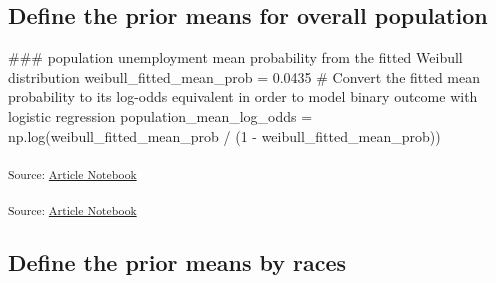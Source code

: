 \documentclass[
]{agujournal2019}
\newenvironment{Shaded}{\begin{snugshade}}{\end{snugshade}}
\newcommand{\CommentTok}[1]{\textcolor[rgb]{0.37,0.37,0.37}{#1}}
\newcommand{\DecValTok}[1]{\textcolor[rgb]{0.68,0.00,0.00}{#1}}
\newcommand{\FloatTok}[1]{\textcolor[rgb]{0.68,0.00,0.00}{#1}}
\newcommand{\NormalTok}[1]{\textcolor[rgb]{0.00,0.23,0.31}{#1}}
\newcommand{\OperatorTok}[1]{\textcolor[rgb]{0.37,0.37,0.37}{#1}}
\begin{document}
\subsection{Define the prior means for overall
population}\label{define-the-prior-means-for-overall-population}

\begin{Shaded}
\begin{Highlighting}[]
\CommentTok{\#\#\# population unemployment mean probability from the fitted Weibull distribution}
\NormalTok{weibull\_fitted\_mean\_prob }\OperatorTok{=} \FloatTok{0.0435}
\CommentTok{\# Convert the fitted mean probability to its log{-}odds equivalent in order to model binary outcome with logistic regression}
\NormalTok{population\_mean\_log\_odds }\OperatorTok{=}\NormalTok{ np.log(weibull\_fitted\_mean\_prob }\OperatorTok{/}\NormalTok{ (}\DecValTok{1} \OperatorTok{{-}}\NormalTok{ weibull\_fitted\_mean\_prob))}
\end{Highlighting}
\end{Shaded}

\textsubscript{Source:
\href{https://mw1296.github.io/dsan5650_social_causal_inference/index.qmd.html}{Article
Notebook}}

\textsubscript{Source:
\href{https://mw1296.github.io/dsan5650_social_causal_inference/index.qmd.html}{Article
Notebook}}

\subsection{Define the prior means by
races}\label{define-the-prior-means-by-races}
\end{document}
